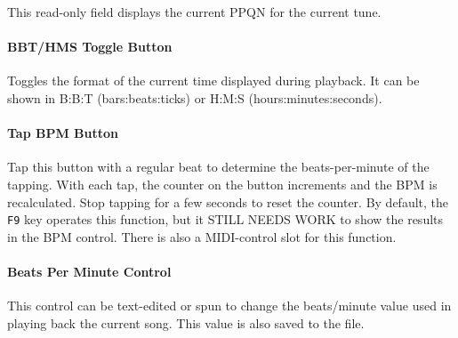 \documentclass[
 11pt,
 twoside,
 a4paper,
 final                                 %
]{article}
\begin{document}
   This read-only field displays the current PPQN for the current tune.


\paragraph{BBT/HMS Toggle Button}
\label{paragraph:introduction_time_format_toggle_button}

   Toggles the format of the current time displayed during playback. 
   It can be shown in B:B:T (bars:beats:ticks) or H:M:S (hours:minutes:seconds).

\paragraph{Tap BPM Button}
\label{paragraph:introduction_tap_bpm_button}

   Tap this button with a regular beat to determine the beats-per-minute of the
   tapping.  With each tap, the counter on the button increments and the BPM is
   recalculated.  Stop tapping for a few seconds to reset the counter.
   By default, the \texttt{F9} key operates this function, but it
   STILL NEEDS WORK to show the results in the BPM control.
   There is also a MIDI-control slot for this function.

\paragraph{Beats Per Minute Control}
\label{paragraph:introduction_bpm_control}

   This control can be text-edited or spun to change the beats/minute value
   used in playing back the current song.  This value is also saved to the
   file.













\end{document}
